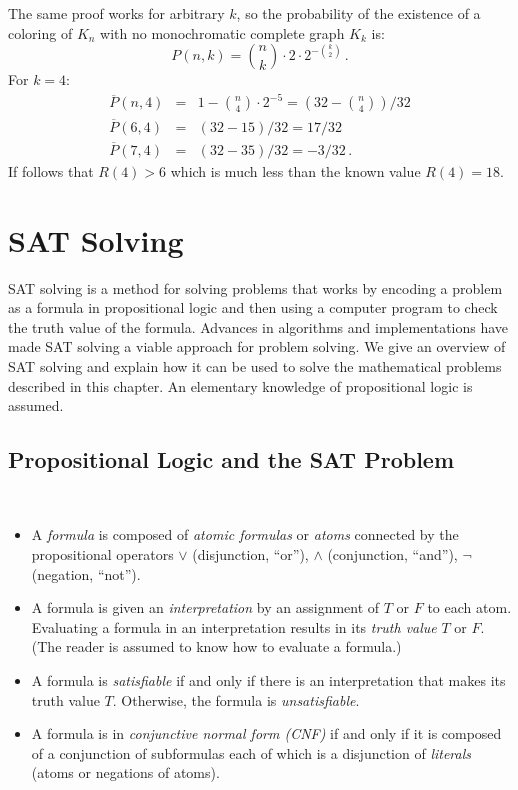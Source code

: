 The same proof works for arbitrary $k$, so the probability of the existence of a coloring of $K_n$ with no monochromatic complete graph $K_k$ is:
\[
P(n,k)=\binom{n}{k}\cdot 2\cdot 2^{-\binom{k}{2}}\,.
\]
For $k=4$:
\begin{eqnarray*}
\overline{P}(n,4)&=&1-\binom{n}{4}\cdot 2^{-5}=\left(32-\binom{n}{4}\right)/32\\
\overline{P}(6,4)&=&(32-15)/32=17/32\\
\overline{P}(7,4)&=&(32-35)/32=-3/32\,.
\end{eqnarray*}
If follows that $R(4)>6$ which is much less than the known value $R(4)=18$.



\section{SAT Solving}\label{s.sat}

SAT solving is a method for solving problems that works by encoding a problem as a formula in propositional logic and then using a computer program to check the truth value of the formula. Advances in algorithms and implementations have made SAT solving a viable approach for problem solving. We give an overview of SAT solving and explain how it can be used to solve the mathematical problems described in this chapter. An elementary knowledge of propositional logic is assumed.

\subsection{Propositional Logic and the SAT Problem}

\begin{definition}\mbox{}\\
\vspace{-2ex}
\begin{itemize}
\item A \emph{formula} is composed of \emph{atomic formulas} or \emph{atoms} connected by the propositional operators $\vee$ (disjunction, ``or''), $\wedge$ (conjunction, ``and''), $\neg$ (negation, ``not'').
\item A formula is given an \emph{interpretation} by an assignment of $T$ or $F$ to each atom. Evaluating a formula in an interpretation results in its \emph{truth value} $T$ or $F$. (The reader is assumed to know how to evaluate a formula.)
\item A formula is \emph{satisfiable} if and only if there is an interpretation that makes its truth value $T$. Otherwise, the formula is \emph{unsatisfiable}.
\item A formula is in \emph{conjunctive normal form (CNF)} if and only if it is composed of a conjunction of subformulas each of which is a disjunction of \emph{literals} (atoms or negations of atoms).
\end{itemize}
\end{definition}

